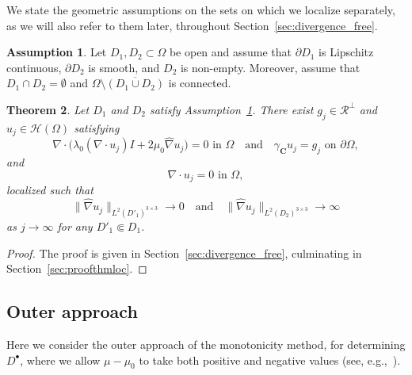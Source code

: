 \documentclass[reqno]{amsart}
\numberwithin{equation}{section}
\numberwithin{figure}{section}
\numberwithin{table}{section}
\newcommand{\norm}[1]{\lVert#1\rVert}
\newcommand{\C}{\mathbf{C}}
\theoremstyle{definition}
\theoremstyle{plain}
\newtheorem{thm}{Theorem}[section]
\theoremstyle{definition}
\newtheorem{assumption}[thm]{Assumption}
\theoremstyle{remark}
\numberwithin{equation}{section}
\begin{document}
We state the geometric assumptions on the sets on which we localize separately, as we will also refer to them later, throughout Section~\ref{sec:divergence_free}.
%
\begin{assumption} \label{assump_D1D2}
	Let $D_1, D_2 \subset \Omega$ be open and assume that $\partial D_1$ is Lipschitz continuous, $\partial D_2$ is smooth, and $D_2$ is non-empty. Moreover, assume that $D_1 \cap D_2 = \emptyset$ and $\Omega \setminus \overline{(D_1 \cup D_2)}$ is connected.
\end{assumption}
%
\begin{thm} \label{thm_loc}
	Let $D_1$ and $D_2$ satisfy Assumption~\ref{assump_D1D2}. There exist $g_j\in\mathcal{R}^\perp$ and $u_j\in\mathcal{H}(\Omega)$ satisfying 
	\begin{equation*}
		\nabla \cdot \big(\lambda_0 (\nabla \cdot u_j) I + 2 \mu_0 \widehat{\nabla} u_j  \big) = 0 \text{ in } \Omega \quad\text{and}\quad \gamma_{\C} u_j = g_j \text{ on }\partial\Omega,
	\end{equation*}
	and 
	\begin{equation*}
		\nabla\cdot u_j = 0 \text{ in } \Omega,
	\end{equation*}
	localized such that
	\begin{equation*}
		\norm{\widehat{\nabla} u_j}_{L^2(D'_1)^{3 \times 3}} \to 0 \quad \text{and} \quad \norm{\widehat{\nabla} u_j}_{L^2(D_2)^{3 \times 3}} \to \infty
	\end{equation*}
	as $j \to \infty$  for any $D'_1 \Subset D_1$. 
\end{thm}
%
\begin{proof}
	The proof is given in Section~\ref{sec:divergence_free}, culminating in Section~\ref{sec:proofthmloc}.
\end{proof}

\subsection{Outer approach} 

Here we consider the outer approach of the monotonicity method, for determining $D^\bullet$, where we allow $\mu-\mu_0$ to take both positive and negative values (see, e.g.,~\cite[Theorem~5.1]{EGH25}).
\end{document}
